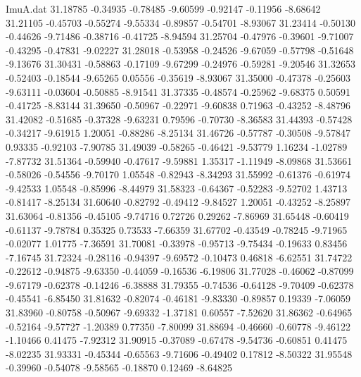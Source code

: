 \begin{filecontents}{ImuA.dat}
  31.18785   -0.34935   -0.78485   -9.60599   -0.92147   -0.11956   -8.68642
  31.21105   -0.45703   -0.55274   -9.55334   -0.89857   -0.54701   -8.93067
  31.23414   -0.50130   -0.44626   -9.71486   -0.38716   -0.41725   -8.94594
  31.25704   -0.47976   -0.39601   -9.71007   -0.43295   -0.47831   -9.02227
  31.28018   -0.53958   -0.24526   -9.67059   -0.57798   -0.51648   -9.13676
  31.30431   -0.58863   -0.17109   -9.67299   -0.24976   -0.59281   -9.20546
  31.32653   -0.52403   -0.18544   -9.65265    0.05556   -0.35619   -8.93067
  31.35000   -0.47378   -0.25603   -9.63111   -0.03604   -0.50885   -8.91541
  31.37335   -0.48574   -0.25962   -9.68375    0.50591   -0.41725   -8.83144
  31.39650   -0.50967   -0.22971   -9.60838    0.71963   -0.43252   -8.48796
  31.42082   -0.51685   -0.37328   -9.63231    0.79596   -0.70730   -8.36583
  31.44393   -0.57428   -0.34217   -9.61915    1.20051   -0.88286   -8.25134
  31.46726   -0.57787   -0.30508   -9.57847    0.93335   -0.92103   -7.90785
  31.49039   -0.58265   -0.46421   -9.53779    1.16234   -1.02789   -7.87732
  31.51364   -0.59940   -0.47617   -9.59881    1.35317   -1.11949   -8.09868
  31.53661   -0.58026   -0.54556   -9.70170    1.05548   -0.82943   -8.34293
  31.55992   -0.61376   -0.61974   -9.42533    1.05548   -0.85996   -8.44979
  31.58323   -0.64367   -0.52283   -9.52702    1.43713   -0.81417   -8.25134
  31.60640   -0.82792   -0.49412   -9.84527    1.20051   -0.43252   -8.25897
  31.63064   -0.81356   -0.45105   -9.74716    0.72726    0.29262   -7.86969
  31.65448   -0.60419   -0.61137   -9.78784    0.35325    0.73533   -7.66359
  31.67702   -0.43549   -0.78245   -9.71965   -0.02077    1.01775   -7.36591
  31.70081   -0.33978   -0.95713   -9.75434   -0.19633    0.83456   -7.16745
  31.72324   -0.28116   -0.94397   -9.69572   -0.10473    0.46818   -6.62551
  31.74722   -0.22612   -0.94875   -9.63350   -0.44059   -0.16536   -6.19806
  31.77028   -0.46062   -0.87099   -9.67179   -0.62378   -0.14246   -6.38888
  31.79355   -0.74536   -0.64128   -9.70409   -0.62378   -0.45541   -6.85450
  31.81632   -0.82074   -0.46181   -9.83330   -0.89857    0.19339   -7.06059
  31.83960   -0.80758   -0.50967   -9.69332   -1.37181    0.60557   -7.52620
  31.86362   -0.64965   -0.52164   -9.57727   -1.20389    0.77350   -7.80099
  31.88694   -0.46660   -0.60778   -9.46122   -1.10466    0.41475   -7.92312
  31.90915   -0.37089   -0.67478   -9.54736   -0.60851    0.41475   -8.02235
  31.93331   -0.45344   -0.65563   -9.71606   -0.49402    0.17812   -8.50322
  31.95548   -0.39960   -0.54078   -9.58565   -0.18870    0.12469   -8.64825

\end{filecontents}
